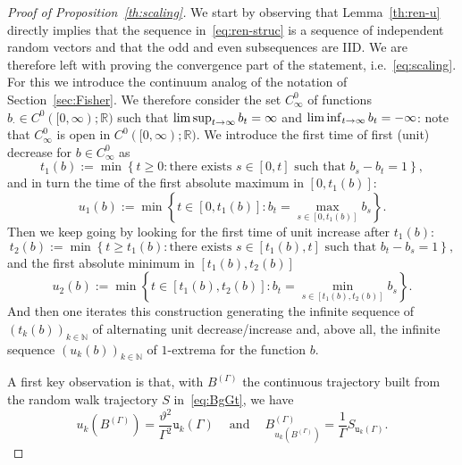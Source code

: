 \documentclass[AHL,Unicode,longabstracts,published]{cedram}
\newcommand{\bbN}{\mathbb{N}}
\newcommand{\bbR}{\mathbb{R}}
\newcommand{\gG}{\Gamma}
\renewcommand*\ss{\mathtt{u}}
\renewcommand*{\to}{\mathchoice{\longrightarrow}{\rightarrow}{\rightarrow}{\rightarrow}}
\begin{document}
\begin{proof}[Proof of Proposition~\ref{th:scaling}]
We start by observing that Lemma~\ref{th:ren-u} directly implies that the sequence in~\eqref{eq:ren-struc} is a sequence of independent random vectors and that the odd and even subsequences are IID. We are therefore left with proving the convergence part of the statement, i.e.~\eqref{eq:scaling}. For this we introduce the continuum analog of the notation of Section~\ref{sec:Fisher}. We therefore consider the set $C^0_\infty$ of functions $b_\cdot \in C^0([0, \infty); \bbR)$ such that $\limsup_{t\to \infty} b_t=\infty$ and $\liminf_{t\to \infty} b_t=-\infty$: note that $C^0_\infty$ is open in $C^0([0, \infty); \bbR)$. We introduce the first time of first (unit) decrease for $b\in C^0_\infty$ as
\begin{equation}
t_1(b) := \min\left\{t\ge 0: \text{there exists } s \in [0,t] \text{ such that } b_s-b_t=1\right\},
\end{equation}
and in turn the time of the first absolute maximum in $[0, t_1(b)]$:
\begin{equation}
u_1(b):= \min\left \{t \in [0, t_1(b)]: b_t= \max_{s \in [0, t_1(b)]} b_s \right\}.
\end{equation}
Then we keep going by looking for the first time of unit increase after $t_1(b)$:
\begin{equation}
t_2(b) := \min\left\{t\ge t_1(b): \text{there exists } s \in [t_1(b),t] \text{ such that } b_t-b_s=1\right\},
\end{equation}
and the first absolute minimum in $[t_1(b), t_2(b)]$
\begin{equation}
u_2(b):= \min\left \{t \in [t_1(b), t_2(b)]: b_t= \min_{s \in [t_1(b), t_2(b)]} b_s \right\}.
\end{equation}
And then one iterates this construction generating the infinite sequence of $(t_k(b))_{k \in \bbN}$ of alternating unit decrease/increase and, above all, the infinite sequence $(u_k(b))_{k \in \bbN}$ of $1$-extrema for the function $b$.

A first key observation is that, with $B^{(\gG)}$ the continuous trajectory built from the random walk trajectory $S$ in~\eqref{eq:BgGt}, we have
\begin{equation}
u_k \left(B^{(\gG)}\right) = \frac{\vartheta^2}{\gG^2} \ss_k(\gG)
\ \quad\text{and}\quad \ B^{(\gG)}_{u_k \left(B^{(\gG)} \right)}=
\frac 1 \gG S_{\ss_k(\gG)}.
\end{equation}


\end{proof}
\end{document}
